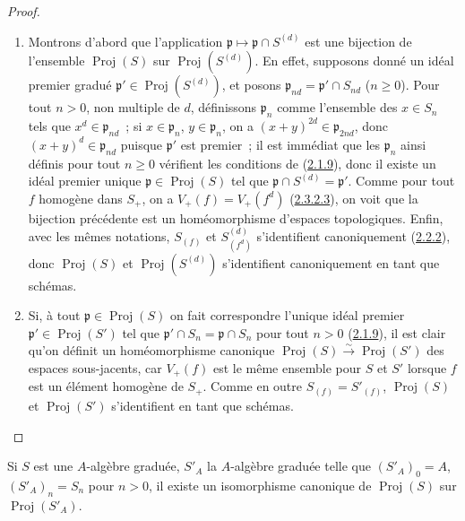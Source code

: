 \begin{proof}
\begin{enumerate}
  \item[\rm(i)] Montrons d'abord que l'application
    $\mathfrak{p}\mapsto\mathfrak{p}\cap S^{(d)}$ est une bijection de
    l'ensemble $\operatorname{Proj}(S)$ sur
    $\operatorname{Proj}(S^{(d)})$. En effet, supposons donné un idéal
    premier gradué $\mathfrak{p}'\in\operatorname{Proj}(S^{(d)})$, et posons
    $\mathfrak{p}_{nd}=\mathfrak{p}'\cap S_{nd}$ ($n\geq0$). Pour tout
    $n>0$, non multiple de $d$, définissons $\mathfrak{p}_n$ comme
    l'ensemble des $x\in S_n$ tels que
    $x^d\in\mathfrak{p}_{nd}$~; si $x\in\mathfrak{p}_n$,
    $y\in\mathfrak{p}_n$, on a
    $(x+y)^{2d}\in\mathfrak{p}_{2nd}$, donc
    $(x+y)^d\in\mathfrak{p}_{nd}$ puisque $\mathfrak{p}'$ est premier~; il
    est immédiat que les $\mathfrak{p}_n$ ainsi définis pour tout $n\geq0$
    vérifient les conditions de
    (\hyperref[II.2.1.9-fr]{2.1.9}), donc il existe un idéal premier unique
    $\mathfrak{p}\in\operatorname{Proj}(S)$ tel que
    $\mathfrak{p}\cap S^{(d)}=\mathfrak{p}'$. Comme pour tout $f$ homogène
    dans $S_+$, on a
    $V_+(f)=V_+(f^d)$ (\hyperref[II.2.3.2.3-fr]{2.3.2.3}), on voit que la
    bijection précédente est un homéomorphisme d'espaces topologiques.
    Enfin, avec les mêmes notations, $S_{(f)}$ et
    $S^{(d)}_{(f^d)}$ s'identifient canoniquement
    (\hyperref[II.2.2.2-fr]{2.2.2}), donc $\operatorname{Proj}(S)$ et
    $\operatorname{Proj}(S^{(d)})$ s'identifient canoniquement en tant que
    schémas.
  \item[\rm(ii)] Si, à tout
    $\mathfrak{p}\in\operatorname{Proj}(S)$ on fait correspondre l'unique
    idéal premier $\mathfrak{p}'\in\operatorname{Proj}(S')$ tel que
    $\mathfrak{p}'\cap S_n=\mathfrak{p}\cap S_n$ pour tout $n>0$
    (\hyperref[II.2.1.9-fr]{2.1.9}), il est clair qu'on définit un
    homéomorphisme canonique
    $\operatorname{Proj}(S)\xrightarrow{\sim}\operatorname{Proj}(S')$ des
    espaces sous-jacents, car $V_+(f)$ est le même ensemble pour $S$ et
    $S'$ lorsque $f$ est un élément homogène de $S_+$. Comme en outre
    $S_{(f)}=S'_{(f)}$, $\operatorname{Proj}(S)$ et
    $\operatorname{Proj}(S')$ s'identifient en tant que schémas.
\end{enumerate}
\end{proof}

\begin{corollary}[2.4.8]
\label{II.2.4.8-fr}
Si $S$ est une $A$-algèbre graduée, $S'_A$ la $A$-algèbre graduée telle que
$(S'_A)_0=A$, $(S'_A)_n=S_n$ pour $n>0$, il existe un isomorphisme canonique
de $\operatorname{Proj}(S)$ sur $\operatorname{Proj}(S'_A)$.
\end{corollary}

